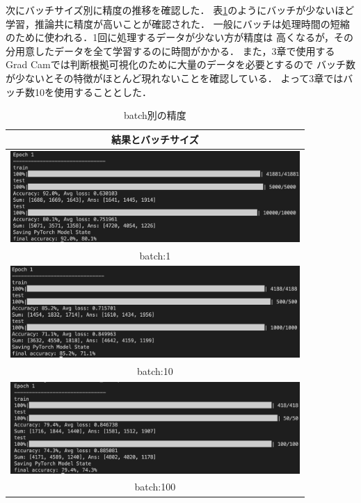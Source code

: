 次にバッチサイズ別に精度の推移を確認した．
表\ref{batch}のようにバッチが少ないほど学習，推論共に精度が高いことが確認された．
一般にバッチは処理時間の短縮のために使われる．1回に処理するデータが少ない方が精度は
高くなるが，その分用意したデータを全て学習するのに時間がかかる．
また，3章で使用するGrad Camでは判断根拠可視化のために大量のデータを必要とするので
バッチ数が少ないとその特徴がほとんど現れないことを確認している．
よって3章ではバッチ数10を使用することとした．

\begin{table}[b]
  \begin{center}
    \begin{tabular}{|c|} \hline
      結果とバッチサイズ \\ \hline
        \includegraphics[width=110mm]{images/net_result/batch1.png} \\ batch:1 \\ \hline
        \includegraphics[width=110mm]{images/net_result/batch10.png} \\ batch:10 \\ \hline
        \includegraphics[width=110mm]{images/net_result/batch100.png} \\ batch:100 \\ \hline
    \end{tabular}
  \end{center}
  \caption{batch別の精度}
  \label{batch}
\end{table}
\clearpage

